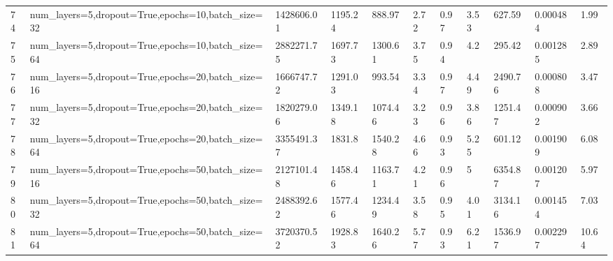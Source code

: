 \begin{longtable}{C{0.8cm} L{2cm} C{1.15cm} C{1.15cm} C{1.15cm} C{1.15cm} C{0.85cm} C{1.25cm} C{1.2cm} C{1.5cm} C{1.0cm}}
74 & num\_layers=5,\newline dropout=True,\newline epochs=10,\newline batch\_size=32 & 1428606.01 & 1195.24 & 888.97 & 2.72 & 0.97 & 3.53 & 627.59 & 0.000484 & 1.99 \\
75 & num\_layers=5,\newline dropout=True,\newline epochs=10,\newline batch\_size=64 & 2882271.75 & 1697.73 & 1300.61 & 3.75 & 0.94 & 4.2 & 295.42 & 0.001285 & 2.89 \\
76 & num\_layers=5,\newline dropout=True,\newline epochs=20,\newline batch\_size=16 & 1666747.72 & 1291.03 & 993.54 & 3.34 & 0.97 & 4.49 & 2490.76 & 0.000808 & 3.47 \\
77 & num\_layers=5,\newline dropout=True,\newline epochs=20,\newline batch\_size=32 & 1820279.06 & 1349.18 & 1074.46 & 3.23 & 0.96 & 3.86 & 1251.47 & 0.000902 & 3.66 \\
78 & num\_layers=5,\newline dropout=True,\newline epochs=20,\newline batch\_size=64 & 3355491.37 & 1831.8 & 1540.28 & 4.66 & 0.93 & 5.25 & 601.12 & 0.001909 & 6.08 \\
79 & num\_layers=5,\newline dropout=True,\newline epochs=50,\newline batch\_size=16 & 2127101.48 & 1458.46 & 1163.71 & 4.21 & 0.96 & 5 & 6354.87 & 0.001207 & 5.97 \\
80 & num\_layers=5,\newline dropout=True,\newline epochs=50,\newline batch\_size=32 & 2488392.62 & 1577.46 & 1234.49 & 3.58 & 0.95 & 4.01 & 3134.16 & 0.001454 & 7.03 \\
81 & num\_layers=5,\newline dropout=True,\newline epochs=50,\newline batch\_size=64 & 3720370.52 & 1928.83 & 1640.26 & 5.77 & 0.93 & 6.21 & 1536.97 & 0.002297 & 10.64 \\

\end{longtable}
